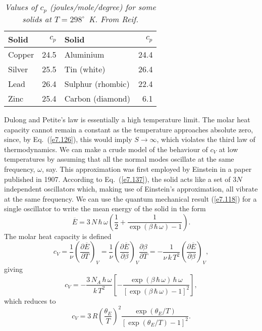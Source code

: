 \begin{table}
\centering
\begin{tabular}{lrlr}\hline
Solid & $c_p$ & Solid &   $c_p$ \\[0.5ex] \hline
Copper & 24.5 & Aluminium & 24.4 \\
Silver & 25.5 & Tin (white) & 26.4 \\
Lead & 26.4 & Sulphur (rhombic) & 22.4\\
Zinc & 25.4 & Carbon (diamond) & 6.1\\
\end{tabular}
\caption{\em Values of $c_p$ (joules/mole/degree) for some solids at $T= 298^\circ$~K. From Reif.}
\label{t3}
\end{table}

Dulong and Petite's law is essentially a high temperature limit. The molar heat capacity cannot
remain a constant as the temperature approaches absolute zero, since, by
 Eq.~(\ref{e7.126}), this
would imply $S\rightarrow \infty$, which violates the third law of thermodynamics. We can make
a crude model of the behaviour of $c_V$ at low temperatures by assuming that all the normal
modes oscillate at the same frequency, $\omega$, say. This approximation was first employed by
Einstein in a paper published in 1907. According to Eq.~(\ref{e7.137}),
the solid acts like a set
of $3N$ independent oscillators which, making use of
Einstein's approximation, all vibrate at the same frequency.
 We can use the quantum mechanical result (\ref{e7.118}) for a single
oscillator  to write the mean energy
of the solid in the form
\begin{equation}
\overline{E} = 3\,N \,\hbar\,\omega\left(\frac{1}{2} + 
\frac{1}{\exp(\beta\,\hbar\,\omega) - 1} \right).
\end{equation}
The molar heat capacity is defined
\begin{equation}
c_V = \frac{1}{\nu}\left(\frac{\partial \overline{E}}{\partial T}\right)_V = 
\frac{1}{\nu}\left(\frac{\partial \overline{E}}{\partial\beta}\right)_V \frac{
\partial\beta}{\partial T} = - \frac{1}{\nu\, k \,T^2} \left(
\frac{\partial\overline{E}}{\partial \beta}\right)_V,\label{e7.141}
\end{equation}
giving
\begin{equation}
c_V = - \frac{3 \,N_A \,\hbar \,\omega}{k\, T^2} \left[
-\frac{\exp(\beta\,\hbar\,\omega)\,\hbar\, \omega}
{[\exp(\beta\,\hbar\, \omega) - 1]^2} \right],
\end{equation}
which reduces to
\begin{equation}
c_V = 3\,R \left(\frac{\theta_E}{T}\right)^2 \frac{\exp(\theta_E / T)}
{[\exp(\theta_E/T) - 1]^2}.\label{e7.143}
\end{equation}

